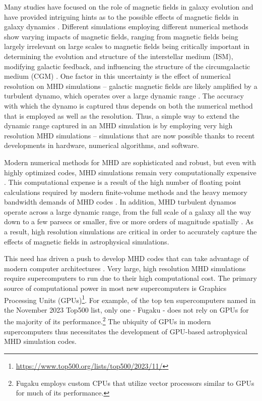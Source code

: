 \documentclass[modern]{aastex631}
\begin{document}
Many studies have focused on the role of magnetic fields in galaxy evolution and have provided intriguing hints as to the possible effects of magnetic fields in galaxy dynamics \citep{shin_2008, banda_2016, grand_auriga_2017, pakmor_magnetic_2017, hopkins_but_2020, wibking_2021}. Different simulations employing different numerical methods show varying impacts of magnetic fields, ranging from magnetic fields being largely irrelevant on large scales to magnetic fields being critically important in determining the evolution and structure of the interstellar medium (ISM), modifying galactic feedback, and influencing the structure of the circumgalactic medium (CGM) \citep{martin-alvarez_how_2020, dobbs_magnetic_2007, kim_vertical_2015, hanasz_global_2009, pakmor_simulations_2013, banda_2017}. One factor in this uncertainty is the effect of numerical resolution on MHD simulations -- galactic magnetic fields are likely amplified by a turbulent dynamo, which operates over a large dynamic range \citep{martin-alvarez_three-phase_2018, beck_1996, gent_2021, carteret_2022, brandenburg_2023}. The accuracy with which the dynamo is captured thus depends on both the numerical method that is employed as well as the resolution. Thus, a simple way to extend the dynamic range captured in an MHD simulation is by employing very high resolution MHD simulations -- simulations that are now possible thanks to recent developments in hardware, numerical algorithms, and software.

Modern numerical methods for MHD are sophisticated and robust, but even with highly optimized codes, MHD simulations remain very computationally expensive \citep{athena++_2020}. This computational expense is a result of the high number of floating point calculations required by modern finite-volume methods and the heavy memory bandwidth demands of MHD codes \citep{k_athena_2021}. In addition, MHD turbulent dynamos operate across a large dynamic range, from the full scale of a galaxy all the way down to a few parsecs or smaller, five or more orders of magnitude spatially \citep{pariev_magnetic_1_2007, pariev_magnetic_2_2007, ntormousi_dynamo_2020, galishnikova_tearing_2022}. As a result, high resolution simulations are critical in order to accurately capture the effects of magnetic fields in astrophysical simulations.

This need has driven a push to develop MHD codes that can take advantage of modern computer architectures \citep[e.g.][]{schive_gamer-2_2018, almgren_castro_2020, zingale_castro_2020, shankar_gram-x_2022, liska_h-amr_2022, begue_cuharm_2023, holmen_early_2023, parthenon_2023}. Very large, high resolution MHD simulations require supercomputers to run due to their high computational cost. The primary source of computational power in most new supercomputers is Graphics Processing Units (GPUs)\footnote{\url{https://www.top500.org/lists/top500/2023/11/}}. For example, of the top ten supercomputers named in the November 2023 Top500 list, only one - Fugaku - does not rely on GPUs for the majority of its performance.\footnote{Fugaku employs custom CPUs that utilize vector processors similar to GPUs for much of its performance.} The ubiquity of GPUs in modern supercomputers thus necessitates the development of GPU-based astrophysical MHD simulation codes.
\end{document}

